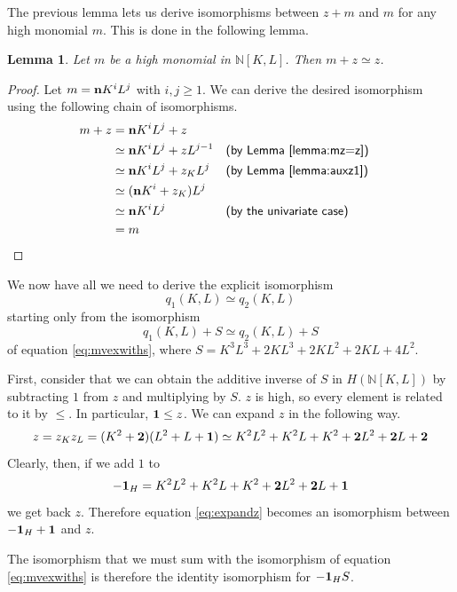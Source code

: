 \documentclass{msthesis}
\newtheorem{lemma}[theorem]{Lemma}
\theoremstyle{definition}
\newcommand{\nat}{\mathbb{N}}
\begin{document}
The previous lemma lets us derive isomorphisms between $z + m$ and $m$ for any high monomial $m$.  This is done in the following lemma.

\begin{lemma}\label{lemma:m+z=z}
    Let $m$ be a high monomial in $\nat[K,L]$.  Then $m + z \simeq z$.
\end{lemma}
\begin{proof}
    Let $m = \mathbf{n}K^iL^j$ with $i, j \ge 1$.  We can derive the desired isomorphism using the following chain of isomorphisms.
    \begin{align*}
        m + z 
        &= \mathbf{n}K^iL^j + z \\
        &\simeq \mathbf{n}K^iL^j + zL^{j-1} && \textsf{(by Lemma \ref{lemma:mz=z})} \\
        &\simeq \mathbf{n}K^iL^j + z_KL^j && \textsf{(by Lemma \ref{lemma:auxz1})} \\
        &\simeq (\mathbf{n}K^i + z_K)L^j \\
        &\simeq \mathbf{n}K^iL^j &&\textsf{(by the univariate case)} \\
        &= m
    \end{align*}
\end{proof}

We now have all we need to derive the explicit isomorphism
\[ q_1(K,L) \simeq q_2(K,L) \]
starting only from the isomorphism
\[ q_1(K,L) + S \simeq q_2(K,L) + S \]
of equation \ref{eq:mvexwiths}, where $S = K^3L^3 + 2KL^3 + 2KL^2 + 2KL + 4L^2$.

First, consider that we can obtain the additive inverse of $S$ in $H(\nat[K,L])$ by subtracting $1$ from $z$ and multiplying by $S$. $z$ is high, so every element is related to it by $\le$.  In particular, $\mathbf{1} \le z$.  We can expand $z$ in the following way.
\begin{equation}\label{eq:expandz}
z = z_Kz_L = (K^2 + \mathbf{2})(L^2 + L + \mathbf{1}) \simeq K^2L^2 + K^2L + K^2 + \mathbf{2}L^2 + \mathbf{2}L + \mathbf{2}
\end{equation}
Clearly, then, if we add $1$ to 
\[ -\mathbf{1}_H = K^2L^2 + K^2L + K^2 + \mathbf{2}L^2 + \mathbf{2}L + \mathbf{1} \]
we get back $z$.  Therefore equation \eqref{eq:expandz} becomes an isomorphism between $-\mathbf{1}_H + \mathbf{1}$ and $z$.

The isomorphism that we must sum with the isomorphism of equation \ref{eq:mvexwiths} is therefore the identity isomorphism for $-\mathbf{1}_H S$.
\end{document}
